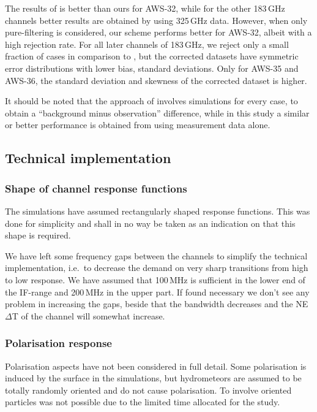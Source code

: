 \documentclass[12pt]{article}
\begin{document}
The results of \citet{rekha2012potential} is better than ours for AWS-32, while for the other 183\,GHz channels better results are obtained by using 325\,GHz data. However, when only pure-filtering is considered, our scheme performs better for AWS-32, albeit with a high rejection rate. For all later channels of 183\,GHz,  we reject only a small fraction of cases in comparison to \citet{rekha2012potential}, but the corrected datasets have symmetric error distributions with lower bias, standard deviations. Only for AWS-35 and AWS-36, the standard deviation and skewness of the corrected dataset is higher. 

It should be noted that the approach of \citet{rekha2012potential} involves
simulations for every case, to obtain a ``background minus observation''
difference, while in this study a similar or better performance is obtained
from using measurement data alone. 


\subsection{Technical implementation}

\subsubsection{Shape of channel response functions}
%
The simulations have assumed rectangularly shaped response functions. This was
done for simplicity and shall in no way be taken as an indication on that this
shape is required.

We have left some frequency gaps between the channels to simplify the technical
implementation, i.e.\ to decrease the demand on very sharp transitions from high
to low response. We have assumed that 100\,MHz is sufficient in the lower end
of the IF-range and 200\,MHz in the upper part. If found necessary we don't see
any problem in increasing the gaps, beside that the bandwidth decreases and the
NE$\Delta$T of the channel will somewhat increase.


\subsubsection{Polarisation response}
%
Polarisation aspects have not been considered in full detail. Some polarisation
is induced by the surface in the simulations, but hydrometeors are assumed to
be totally randomly oriented and do not cause polarisation. To involve oriented
particles was not possible due to the limited time allocated for the study.
\end{document}
